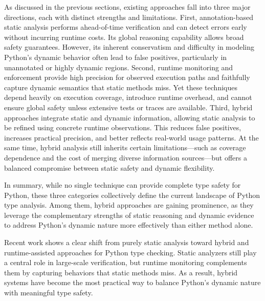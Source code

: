 As discussed in the previous sections, existing approaches fall into three
major directions, each with distinct strengths and limitations.
First, annotation-based static analysis performs ahead-of-time verification and
can detect errors early without incurring runtime costs.
Its global reasoning capability allows broad safety guarantees. However, its
inherent conservatism and difficulty in modeling Python’s dynamic behavior
often lead to false positives, particularly in unannotated or highly dynamic
regions.
Second, runtime monitoring and enforcement provide high precision for observed
execution paths and faithfully capture dynamic semantics that static methods
miss.
Yet these techniques depend heavily on execution coverage, introduce runtime
overhead, and cannot ensure global safety unless extensive tests or traces are
available.
Third, hybrid approaches integrate static and dynamic information, allowing
static analysis to be refined using concrete runtime observations.
This reduces false positives, increases practical precision, and better
reflects real-world usage patterns. At the same time, hybrid analysis still
inherits certain limitations—such as coverage dependence and the cost of
merging diverse information sources—but offers a balanced compromise between
static safety and dynamic flexibility.

In summary, while no single technique can provide complete type safety for
Python, these three categories collectively define the current landscape of
Python type analysis.
Among them, hybrid approaches are gaining prominence, as they leverage the
complementary strengths of static reasoning and dynamic evidence to address
Python’s dynamic nature more effectively than either method alone.

\begin{tcolorbox}[colback=white,colframe=blue!60,title=Answer to RQ1,fonttitle=\bfseries]
  Recent work shows a clear shift from purely static analysis toward hybrid and
  runtime-assisted approaches for Python type checking. Static analyzers still
  play a central role in large-scale verification, but runtime monitoring
  complements them by capturing behaviors that static methods miss. As a
  result, hybrid systems have become the most practical way to balance Python’s
  dynamic nature with meaningful type safety.
\end{tcolorbox}
